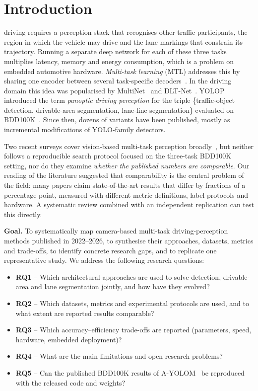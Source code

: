 \documentclass[journal,onecolumn]{IEEEtran}
\begin{document}
\section{Introduction}
 driving requires a perception stack that recognises other traffic participants, the region in which the vehicle may drive and the lane markings that constrain its trajectory. Running a separate deep network for each of these three tasks multiplies latency, memory and energy consumption, which is a problem on embedded automotive hardware. \emph{Multi-task learning} (MTL) addresses this by sharing one encoder between several task-specific decoders~\cite{vandenhende2022mtl}. In the driving domain this idea was popularised by MultiNet~\cite{teichmann2018multinet} and DLT-Net~\cite{qian2020dltnet}. YOLOP~\cite{wu2022yolop} introduced the term \emph{panoptic driving perception} for the triple \{traffic-object detection, drivable-area segmentation, lane-line segmentation\} evaluated on BDD100K~\cite{yu2020bdd100k}. Since then, dozens of variants have been published, mostly as incremental modifications of YOLO-family detectors.

Two recent surveys cover vision-based multi-task perception broadly~\cite{review2025sensors,li2024panopticsurvey}, but neither follows a reproducible search protocol focused on the three-task BDD100K setting, nor do they examine \emph{whether the published numbers are comparable}. Our reading of the literature suggested that comparability is the central problem of the field: many papers claim state-of-the-art results that differ by fractions of a percentage point, measured with different metric definitions, label protocols and hardware. A systematic review combined with an independent replication can test this directly.

\textbf{Goal.} To systematically map camera-based multi-task driving-perception methods published in 2022--2026, to synthesise their approaches, datasets, metrics and trade-offs, to identify concrete research gaps, and to replicate one representative study. We address the following research questions:
\begin{itemize}
\item \textbf{RQ1} -- Which architectural approaches are used to solve detection, drivable-area and lane segmentation jointly, and how have they evolved?
\item \textbf{RQ2} -- Which datasets, metrics and experimental protocols are used, and to what extent are reported results comparable?
\item \textbf{RQ3} -- Which accuracy--efficiency trade-offs are reported (parameters, speed, hardware, embedded deployment)?
\item \textbf{RQ4} -- What are the main limitations and open research problems?
\item \textbf{RQ5} -- Can the published BDD100K results of A-YOLOM~\cite{wang2024ayolom} be reproduced with the released code and weights?
\end{itemize}
\end{document}
